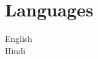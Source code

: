 \documentclass[letterpaper,11pt]{article}
\begin{document}




\section{Languages}
 \begin{itemize}[leftmargin=0.15in, label={}]
    \small{\item{
     {English} \\
     {Hindi} \\
    }}
 \end{itemize}
\end{document}
